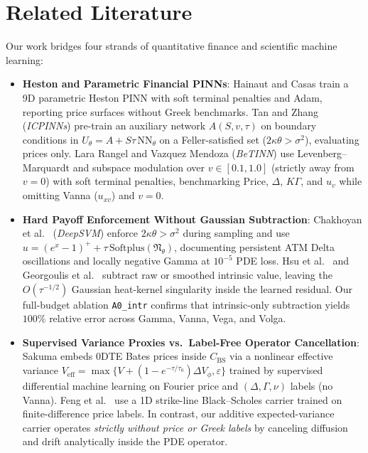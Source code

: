 \documentclass[11pt,a4paper]{article}
\begin{document}
\section{Related Literature}
\label{sec:lit}

Our work bridges four strands of quantitative finance and scientific machine learning:
\begin{itemize}
  \item \textbf{Heston and Parametric Financial PINNs}: Hainaut and Casas \cite{hainaut2024option} train a 9D parametric Heston PINN with soft terminal penalties and Adam, reporting price surfaces without Greek benchmarks. Tan and Zhang \cite{tan2026icpinns} (\emph{ICPINNs}) pre-train an auxiliary network $A(S,v,\tau)$ on boundary conditions in $U_\theta = A + S\tau\,\mathrm{NN}_\theta$ on a Feller-satisfied set ($2\kappa\theta > \sigma^2$), evaluating prices only. Lara Rangel and Vazquez Mendoza \cite{lararangel2026betinn} (\emph{BeTINN}) use Levenberg--Marquardt and subspace modulation over $v \in [0.1, 1.0]$ (strictly away from $v = 0$) with soft terminal penalties, benchmarking Price, $\Delta$, $K\Gamma$, and $u_v$ while omitting Vanna ($u_{xv}$) and $v = 0$.
  \item \textbf{Hard Payoff Enforcement Without Gaussian Subtraction}: Chakhoyan et al.\ \cite{chakhoyan2025deepsvm} (\emph{DeepSVM}) enforce $2\kappa\theta > \sigma^2$ during sampling and use $u = (e^x - 1)^+ + \tau\,\mathrm{Softplus}(\mathfrak{N}_\theta)$, documenting persistent ATM Delta oscillations and locally negative Gamma at $10^{-5}$ PDE loss. Hsu et al.\ \cite{hsu2024accurate} and Georgoulis et al.\ \cite{georgoulis2026deep} subtract raw or smoothed intrinsic value, leaving the $O(\tau^{-1/2})$ Gaussian heat-kernel singularity inside the learned residual. Our full-budget ablation \texttt{A0\_intr} confirms that intrinsic-only subtraction yields $100\%$ relative error across Gamma, Vanna, Vega, and Volga.
  \item \textbf{Supervised Variance Proxies vs.\ Label-Free Operator Cancellation}: Sakuma \cite{sakuma2026dml} embeds 0DTE Bates prices inside $C_{\mathrm{BS}}$ via a nonlinear effective variance $V_{\mathrm{eff}} = \max\{V + (1 - e^{-\tau/\tau_0})\Delta V_\phi, \varepsilon\}$ trained by supervised differential machine learning on Fourier price and $(\Delta, \Gamma, \nu)$ labels (no Vanna). Feng et al.\ \cite{feng2026fideeponet} use a 1D strike-line Black--Scholes carrier trained on finite-difference price labels. In contrast, our additive expected-variance carrier operates \emph{strictly without price or Greek labels} by canceling diffusion and drift analytically inside the PDE operator.

\end{itemize}
\end{document}
